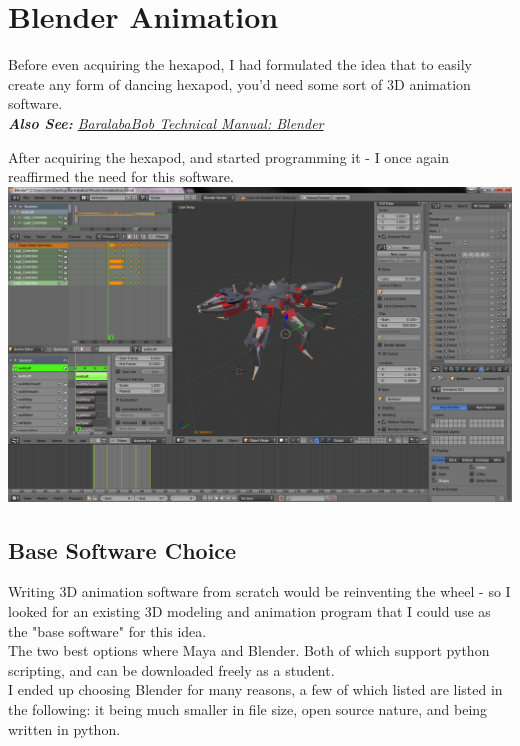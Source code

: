 		\chapter{Blender Animation}
			Before even acquiring the hexapod, I had formulated the idea that to easily create any form of dancing hexapod, you'd need some sort of 3D animation software.\\				
         	\textit{\textbf{Also See: }\hyperref[manual_blender]{BaralabaBob Technical Manual: Blender}}
            
			After acquiring the hexapod, and started programming it - I once again reaffirmed the need for this software.\\
			
			\includegraphics[width=\linewidth]{images/blender}
			
			\section{Base Software Choice}
				Writing 3D animation software from scratch would be reinventing the wheel - so I looked for an existing 3D modeling and animation program that I could use as the "base software" for this idea.\\
				
				The two best options where Maya and Blender. Both of which support python scripting, and can be downloaded freely as a student.\\
				
				I ended up choosing Blender for many reasons, a few of which listed are listed in the following: it being much smaller in file size, open source nature, and being written in python.\\
				
